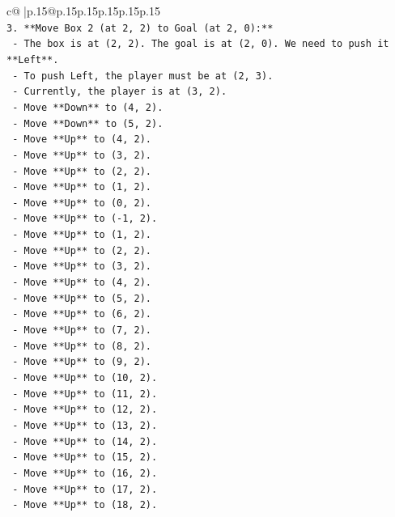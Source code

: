 \documentclass{article}
\begin{document}
{\begin{supertabular}{c@{$\;$}|p{.15\linewidth}@{}p{.15\linewidth}p{.15\linewidth}p{.15\linewidth}p{.15\linewidth}p{.15\linewidth}}
{{{\\ 
\texttt{3.  **Move Box 2 (at 2, 2) to Goal (at 2, 0):**} \\
\texttt{    {-} The box is at (2, 2). The goal is at (2, 0). We need to push it **Left**.} \\
\texttt{    {-} To push Left, the player must be at (2, 3).} \\
\texttt{    {-} Currently, the player is at (3, 2).} \\
\texttt{    {-} Move **Down** to (4, 2).} \\
\texttt{    {-} Move **Down** to (5, 2).} \\
\texttt{    {-} Move **Up** to (4, 2).} \\
\texttt{    {-} Move **Up** to (3, 2).} \\
\texttt{    {-} Move **Up** to (2, 2).} \\
\texttt{    {-} Move **Up** to (1, 2).} \\
\texttt{    {-} Move **Up** to (0, 2).} \\
\texttt{    {-} Move **Up** to ({-}1, 2).} \\
\texttt{    {-} Move **Up** to (1, 2).} \\
\texttt{    {-} Move **Up** to (2, 2).} \\
\texttt{    {-} Move **Up** to (3, 2).} \\
\texttt{    {-} Move **Up** to (4, 2).} \\
\texttt{    {-} Move **Up** to (5, 2).} \\
\texttt{    {-} Move **Up** to (6, 2).} \\
\texttt{    {-} Move **Up** to (7, 2).} \\
\texttt{    {-} Move **Up** to (8, 2).} \\
\texttt{    {-} Move **Up** to (9, 2).} \\
\texttt{    {-} Move **Up** to (10, 2).} \\
\texttt{    {-} Move **Up** to (11, 2).} \\
\texttt{    {-} Move **Up** to (12, 2).} \\
\texttt{    {-} Move **Up** to (13, 2).} \\
\texttt{    {-} Move **Up** to (14, 2).} \\
\texttt{    {-} Move **Up** to (15, 2).} \\
\texttt{    {-} Move **Up** to (16, 2).} \\
\texttt{    {-} Move **Up** to (17, 2).} \\
\texttt{    {-} Move **Up** to (18, 2).} \\
}}}
\end{supertabular}}
\end{document}
